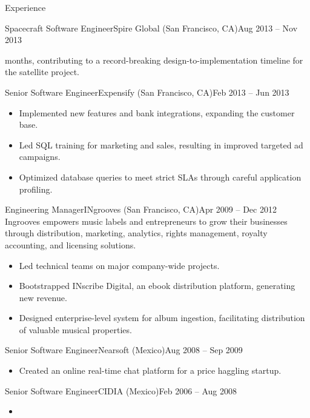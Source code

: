 \documentclass[colibri]{mcdowellcv}
\begin{document}
\begin{cvsection}{Experience}
\begin{cvsubsection}{Spacecraft Software Engineer}{Spire Global (San Francisco, CA)}{Aug 2013 -- Nov 2013}
\begin{itemize}
      months, contributing to a record-breaking design-to-implementation timeline for
      the satellite project.
		\end{itemize}
	\end{cvsubsection}
	\begin{cvsubsection}{Senior Software Engineer}{Expensify (San Francisco, CA)}{Feb 2013 -- Jun 2013}
		\begin{itemize}
    \item
      Implemented new features and bank integrations, expanding the customer base.
    \item
      Led SQL training for marketing and sales, resulting in improved targeted
      ad campaigns.
    \item
      Optimized database queries to meet strict SLAs through careful application
      profiling.
		\end{itemize}
	\end{cvsubsection}
	\begin{cvsubsection}{Engineering Manager}{INgrooves (San Francisco, CA)}{Apr 2009 -- Dec 2012}
    Ingrooves empowers music labels and entrepreneurs to grow their businesses
    through distribution, marketing, analytics, rights management, royalty
    accounting, and licensing solutions.
    \newline
		\begin{itemize}
    \item
      Led technical teams on major company-wide projects.
    \item
      Bootstrapped INscribe Digital, an ebook distribution platform, generating
      new revenue.
    \item
      Designed enterprise-level system for album ingestion, facilitating
      distribution of valuable musical properties.
    \end{itemize}
	\end{cvsubsection}
	\begin{cvsubsection}{Senior Software Engineer}{Nearsoft (Mexico)}{Aug 2008 -- Sep 2009}
		\begin{itemize}
    \item
      Created an online real-time chat platform for a price haggling startup.
		\end{itemize}
	\end{cvsubsection}
	\begin{cvsubsection}{Senior Software Engineer}{CIDIA (Mexico)}{Feb 2006 -- Aug 2008}
		\begin{itemize}
    \item

\end{itemize}
\end{cvsubsection}
\end{cvsection}
\end{document}
